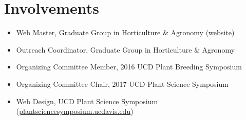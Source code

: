 ﻿\documentclass[a4paper]{article}
\begin{document}
\section*{Involvements}
\begin{itemize}[noitemsep,topsep=0pt]
\item{Web Master, Graduate Group in Horticulture \& Agronomy (\href{http://hortaggradstudents.ucdavis.edu}{website})}
\item{Outreach Coordinator, Graduate Group in Horticulture \& Agronomy}
\item{Organizing Committee Member, 2016 UCD Plant Breeding Symposium}
\item{Organizing Committee Chair, 2017 UCD Plant Science Symposium}
\item{Web Design, UCD Plant Science Symposium (\href{http://plantsciencesymposium.ucdavis.edu}{plantsciencesymposium.ucdavis.edu})}
\end{itemize}

\end{document}

